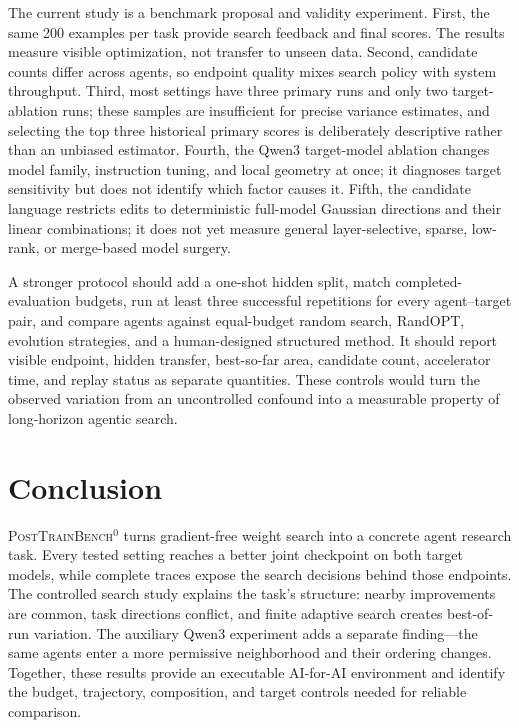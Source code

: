 \documentclass{article}
\newcommand{\bench}{\textsc{PostTrainBench}$^{0}$}
\begin{document}
The current study is a benchmark proposal and validity experiment. First, the same 200
examples per task provide search feedback and final scores. The results measure visible
optimization, not transfer to unseen data. Second, candidate counts differ across agents,
so endpoint quality mixes search policy with system throughput. Third, most settings have
three primary runs and only two target-ablation runs; these samples are insufficient for
precise variance estimates, and selecting the top three historical primary scores is
deliberately descriptive rather than an unbiased estimator. Fourth, the Qwen3 target-model ablation changes model
family, instruction tuning, and local geometry at once; it diagnoses target sensitivity
but does not identify which factor causes it. Fifth, the candidate language restricts edits to deterministic
full-model Gaussian directions and their linear combinations; it does not yet measure
general layer-selective, sparse, low-rank, or merge-based model surgery.

A stronger protocol should add a one-shot hidden split, match completed-evaluation budgets,
run at least three successful repetitions for every agent--target pair, and compare agents
against equal-budget random search, RandOPT, evolution strategies, and a human-designed
structured method. It should report visible endpoint, hidden transfer, best-so-far area,
candidate count, accelerator time, and replay status as separate quantities. These controls
would turn the observed variation from an uncontrolled confound into a measurable property
of long-horizon agentic search.

\section{Conclusion}

\bench{} turns gradient-free weight search into a concrete agent research task. Every
tested setting reaches a better joint checkpoint on both target models, while complete
traces expose the search decisions behind those endpoints. The controlled search study explains the task's
structure: nearby improvements are common, task directions conflict, and finite adaptive
search creates best-of-run variation. The auxiliary Qwen3 experiment adds a separate
finding---the same agents enter a more permissive neighborhood and their ordering changes.
Together, these results provide an executable AI-for-AI environment and identify the
budget, trajectory, composition, and target controls needed for reliable comparison.
\end{document}
